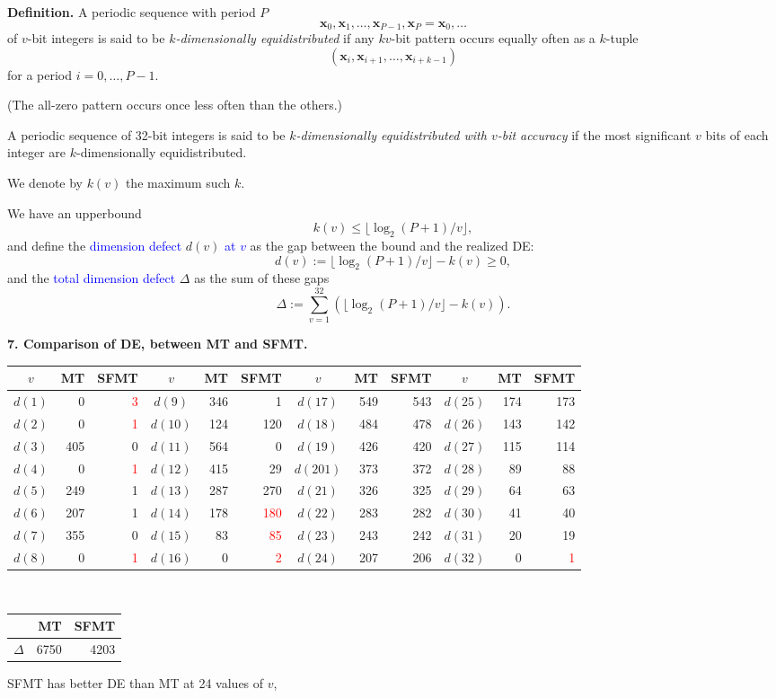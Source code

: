 \documentclass[a4j,12pt,landscape]{jarticle}
\def\bx{{{\mathbf x}}}
\begin{document}
{\bf Definition.} 
A periodic sequence with period $P$
$$\bx_0, \bx_1, \ldots, \bx_{P-1}, \bx_P=\bx_0, \ldots$$
of $v$-bit integers is said to be {\em $k$-dimensionally equidistributed}
if any $kv$-bit pattern occurs equally often as a $k$-tuple
$$
(\bx_i, \bx_{i+1}, \ldots, \bx_{i+k-1})
$$
for a period $i=0,\ldots, P-1$. 

(The all-zero pattern occurs once less often than the others.)

\newpage
A periodic sequence of 32-bit integers is said to be
{\em $k$-dimensionally equidistributed with $v$-bit accuracy}
if the most significant $v$ bits of each integer are
$k$-dimensionally equidistributed. 

We denote by $k(v)$ the maximum such $k$. 

\vskip 5mm
We have an upperbound 
$$
k(v) \leq \lfloor \log_2 (P+1) / v \rfloor, 
$$
and define the \textcolor{blue}{dimension defect} $d(v)$ \textcolor{blue}{at $v$}
as the gap between the bound and the realized DE:
$$
d(v):= \lfloor \log_2 (P+1) / v \rfloor - k(v) \geq 0, 
$$
and the \textcolor{blue}{total dimension defect} $\Delta$
as the sum of these gaps 
$$
\Delta := \sum_{v=1}^{32}(\lfloor \log_2 (P+1) / v \rfloor -k(v)).
$$

\newpage
{\bf 7. Comparison of DE, between MT and SFMT.}
\begin{center}
\LARGE
\begin{tabular}{|c|rr||c|rr||c|rr||c|rr|} \hline
$v$ & MT & SFMT & $v$ & MT & SFMT & $v$ & MT & SFMT & $v$ & MT & SFMT\\ \hline
$d(1)$& 0 & \textcolor{red}{3}
 &$d(9)$& 346 & 1 & $d(17)$ & 549 & 543 & $d(25)$ & 174 & 173\\
$d(2)$& 0 & \textcolor{red}{1} 
&$d(10)$& 124 & 120 & $d(18)$ & 484 & 478 & $d(26)$ & 143 & 142\\
$d(3)$& 405 & 0 &$d(11)$& 564 & 0 & $d(19)$ & 426 & 420 & $d(27)$ & 115 & 114\\
$d(4)$& 0 & \textcolor{red}{1}
 &$d(12)$& 415 & 29 & $d(201)$ & 373 & 372 & $d(28)$ & 89 & 88\\
$d(5)$& 249 & 1 &$d(13)$& 287 & 270 & $d(21)$ & 326 & 325 & $d(29)$ & 64 & 63\\
$d(6)$& 207 & 1 &$d(14)$& 178 & \textcolor{red}{180}
 & $d(22)$ & 283 & 282 & $d(30)$ & 41 & 40\\
$d(7)$& 355 & 0 &$d(15)$& 83 & \textcolor{red}{85}
 & $d(23)$ & 243 & 242 & $d(31)$ & 20 & 19\\
$d(8)$& 0 & \textcolor{red}{1} &$d(16)$& 0 & \textcolor{red}{2}
 & $d(24)$ & 207 & 206 & $d(32)$ & 0 & \textcolor{red}{1} \\ \hline
\end{tabular}\\
\vskip 10mm
\begin{tabular}{crr}\hline
 & MT & SFMT \\ \hline
  $\Delta$ & 6750 & 4203 \\\hline
\end{tabular}
\end{center}
SFMT has better DE than MT at 24 values of $v$, 
\end{document}
